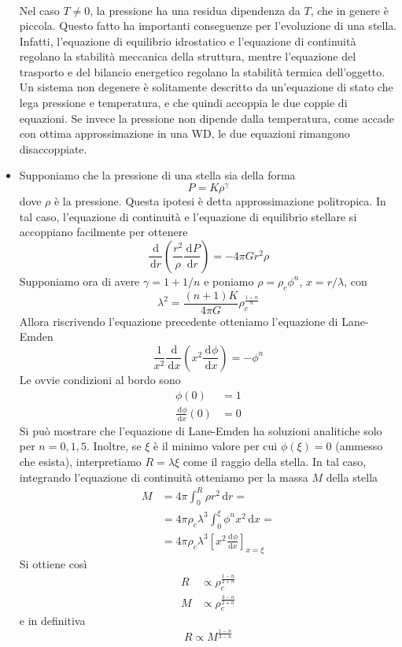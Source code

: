 \documentclass[a4paper,11pt]{article}
\renewcommand{\d}{\mathrm{d}} %
\newcommand{\der}[3][]{\frac{\d ^{#1}#2}{\d {#3}^{#1}}} %
\renewcommand{\d}{\,\mathrm{d}}
\theoremstyle{theorem}
\theoremstyle{definition}
\begin{document}
\begin{itemize}
\begin{align*}
		\end{align*}
		Nel caso $T\neq0$, la pressione ha una residua dipendenza da $T$, che in genere è piccola. Questo fatto ha importanti conseguenze per l'evoluzione di una stella. Infatti, l'equazione di equilibrio idrostatico e l'equazione di continuità regolano la stabilità meccanica della struttura, mentre l'equazione del trasporto e del bilancio energetico regolano la stabilità termica dell'oggetto. Un sistema non degenere è solitamente descritto da un'equazione di stato che lega pressione e temperatura, e che quindi accoppia le due coppie di equazioni. Se invece la pressione non dipende dalla temperatura, come accade con ottima approssimazione in una WD, le due equazioni rimangono disaccoppiate.
		\item Supponiamo che la pressione di una stella sia della forma
		\[P=K\rho^\gamma\]
		dove $\rho$ è la pressione. Questa ipotesi è detta approssimazione politropica. In tal caso, l'equazione di continuità e l'equazione di equilibrio stellare si accoppiano facilmente per ottenere
		\[\der{}{r}\left(\frac{r^2}{\rho}\der{P}{r}\right)=-4\pi Gr^2\rho\]
		Supponiamo ora di avere $\gamma=1+1/n$ e poniamo $\rho=\rho_c\phi^n$, $x=r/\lambda$, con
		\[\lambda^2=\frac{(n+1)K}{4\pi G}\rho_c^{\frac{1-n}{n}}\]
		Allora riscrivendo l'equazione precedente otteniamo l'equazione di Lane-Emden
		\[\frac{1}{x^2}\der{}{x}\left(x^2\der{\phi}{x}\right)=-\phi^n\]
		Le ovvie condizioni al bordo sono
		\begin{align*}
			\phi(0)&=1\\\der{\phi}{x}(0)&=0
		\end{align*}
		Si può mostrare che l'equazione di Lane-Emden ha soluzioni analitiche solo per $n=0,1,5$. Inoltre, se $\xi$ è il minimo valore per cui $\phi(\xi)=0$ (ammesso che esista), interpretiamo $R=\lambda\xi$ come il raggio della stella. In tal caso, integrando l'equazione di continuità otteniamo per la massa $M$ della stella
		\begin{align*}
			M&=4\pi\int_{0}^{R}\rho r^2\d r=\\&=4\pi \rho_c\lambda^3\int_{0}^{\xi}\phi^nx^2\d x=\\&=4\pi\rho_c\lambda^3\left[x^2\der{\phi}{x}\right]_{x=\xi}
		\end{align*}
		Si ottiene così
		\begin{align*}
			R&\propto\rho_c^{\frac{1-n}{2+n}}\\M&\propto\rho_c^{\frac{3-n}{2+n}}
		\end{align*}
		e in definitiva
		\[R\propto M^{\frac{1-n}{3-n}}\]

\end{itemize}
\end{document}
